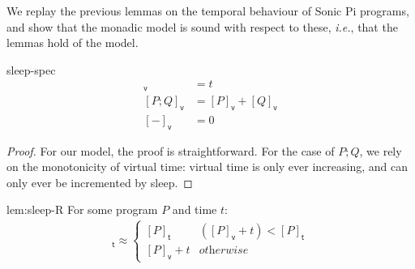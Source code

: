 \documentclass[preprint]{sigplanconf}
\newcommand{\note}[1]{{\color{blue}{#1}}}
\theoremstyle{definition}
\newcommand{\sleep}{\mathsf{sleep}\;}
\newcommand{\lang}{Sonic Pi}
\newcommand{\vtime}[1]{[#1]_{\mathsf{v}}}
\newcommand{\etime}[1]{[#1]_{\mathsf{t}}}
\newcommand{\ie}{\emph{i.e.}}
\begin{document}
We replay the previous lemmas on the temporal behaviour of \lang{} programs,
and show that the monadic model is sound with respect to these, \ie{},
that the lemmas hold of the model.

\noindent
\begin{repdefinition}{sleep-spec}
\begin{align*}
\vtime{\sleep t} & = t \\
\vtime{P; Q} & = \vtime{P} + \vtime{Q} \\
\vtime{-} & = 0
\end{align*}
\end{repdefinition}

\begin{proof}
For our model, the proof is straightforward. For the case of
$P; Q$, we rely on the monotonicity of virtual time: virtual
time is only ever increasing, and can only ever be incremented by sleep.
\note{Could put more here}
\end{proof}

\begin{replemma}{lem:sleep-R}
For some program $P$ and time $t$:
\begin{align*}
\etime{P; \sleep{} t} \approx
 \begin{cases}
   \etime{P} & (\vtime{P} + t) < \etime{P} \\
   \vtime{P} + t  & \textit{otherwise}
 \end{cases}
\end{align*}
\end{replemma}
\end{document}
